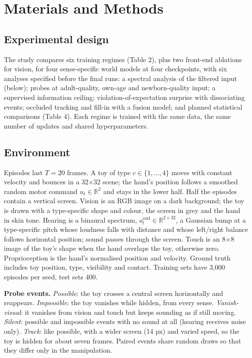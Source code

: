 \documentclass{article}
\begin{document}
\section{Materials and Methods}

\hypertarget{experimental-design}{%
\subsection{Experimental design}\label{experimental-design}}

The study compares six training regimes (Table 2), plus two front-end ablations for vision, for four sense-specific world models at four checkpoints, with six analyses specified before the final runs: a spectral analysis of the filtered input (below); probes at adult-quality, own-age and newborn-quality input; a supervised information ceiling; violation-of-expectation surprise with dissociating events; occluded tracking and fill-in with a fusion model; and planned statistical comparisons (Table 4). Each regime is trained with the same data, the same number of updates and shared hyperparameters.

\hypertarget{environment}{%
\subsection{Environment}\label{environment}}

Episodes last \(T=20\) frames. A toy of type \(c\in\{1,\dots,4\}\) moves with constant velocity and bounces in a 32\ensuremath{\times}32 scene; the hand's position follows a smoothed random motor command \(u_t\in\mathbb R^2\) and stays in the lower half. Half the episodes contain a vertical screen. Vision is an RGB image on a dark background; the toy is drawn with a type-specific shape and colour, the screen in grey and the hand in skin tone. Hearing is a binaural spectrum, \(o^{\text{aud}}_t\in\mathbb R^{2\times32}\), a Gaussian bump at a type-specific pitch whose loudness falls with distance and whose left/right balance follows horizontal position; sound passes through the screen. Touch is an 8\ensuremath{\times}8 image of the toy's shape when the hand overlaps the toy, otherwise zero. Proprioception is the hand's normalised position and velocity. Ground truth includes toy position, type, visibility and contact. Training sets have 3,000 episodes per seed, test sets 400.

\textbf{Probe events.} \emph{Possible}: the toy crosses a central screen horizontally and reappears. \emph{Impossible}: the toy vanishes while hidden, from every sense. \emph{Vanish-visual}: it vanishes from vision and touch but keeps sounding as if still moving. \emph{Silent}: possible and impossible events with no sound at all (hearing receives noise only). \emph{Track}: like possible, with a wider screen (14 px) and varied speed, so the toy is hidden for about seven frames. Paired events share random draws so that they differ only in the manipulation.
\end{document}
